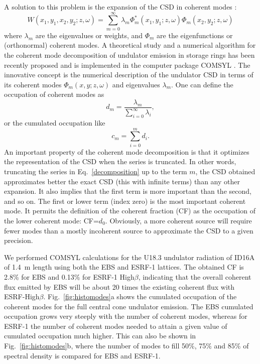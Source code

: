 \documentclass{iucr}              %
\newcommand{\inred}[1]{{\color{black}#1}}
\begin{document}
A solution to this problem is the expansion of the CSD in coherent modes \cite{mandel_wolf}:  
\begin{equation}\label{decomposition}
 W(x_1,y_1,x_2,y_2;z,\omega) = \sum\limits_{m=0}^{\infty} \lambda_m \Phi_m^{*}(x_1,y_1;z,\omega) \Phi_m(x_2,y_2;z,\omega)
 \end{equation}
where $\lambda_m$ are the eigenvalues or weights, and $\Phi_m$ are the eigenfunctions or (orthonormal) coherent modes. A theoretical study and a numerical algorithm for the coherent mode decomposition of undulator emission in storage rings has been recently proposed  \cite{GlassThesis,GlassEPL} and is implemented in the computer package COMSYL \cite{codeCOMSYL}. The innovative concept is the numerical description of the undulator CSD in terms of its coherent modes $\Phi_m(x,y;z,\omega)$ and eigenvalues $\lambda_m $. One can define the occupation of coherent modes as
\begin{equation}
 d_m = \frac{\lambda_m}{\sum\limits_{i=0}^{\infty} \lambda_i},
\end{equation}
or the cumulated occupation like
\begin{equation}
 c_m = \sum\limits_{i=0}^{m} d_i.
\end{equation}
An important property of the coherent mode decomposition is that it optimizes the representation of the CSD when the series is truncated. In other words, truncating the series in Eq.~\ref{decomposition} up to the term $m$, the CSD obtained approximates better the exact CSD (this with infinite terms) than any other expansion. It also implies that the first term is more important than the second, and so on. The first or lower term (index zero) is the most important coherent mode. It permits the definition of the coherent fraction (CF) as the occupation of the lower coherent mode: CF=$d_0$. Obviously, a more coherent source will require fewer modes than a mostly incoherent source to approximate the CSD to a given precision.

We performed COMSYL calculations for the U18.3 undulator radiation of ID16A of 1.4~m length using both the EBS and ESRF-1 lattices. The obtained CF is 2.8\% for EBS and 0.13\% for ESRF-1 High$\beta$, indicating that the overall coherent flux emitted by EBS will be about 20 times the existing coherent flux with ESRF-High$\beta$. Fig.~\ref{fig:histomodes}a shows the cumulated occupation of the coherent modes for the full central cone undulator emission. The EBS cumulated occupation grows very steeply with the number of coherent modes, whereas for ESRF-1 the number of coherent modes needed to attain a given value of cumulated occupation much higher. This can also be shown in Fig.~\ref{fig:histomodes}b, where the number of modes to fill 50\%, 75\% and \inred{85\%} of spectral density is compared for EBS and ESRF-1.   
\end{document}
